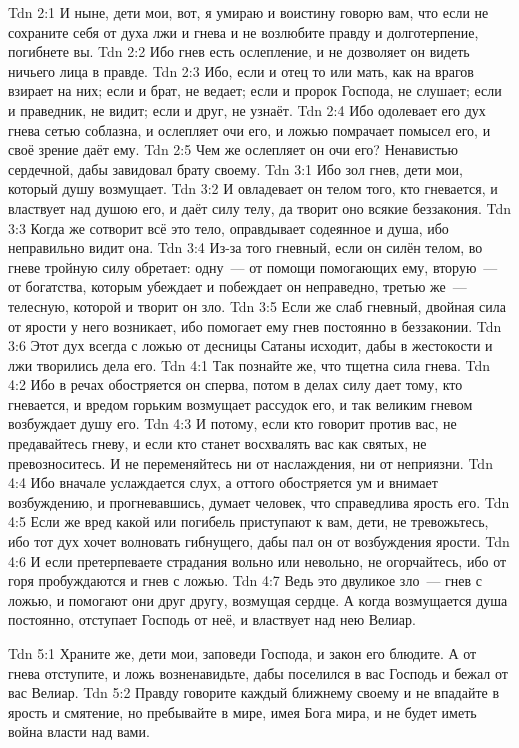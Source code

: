 \vs Tdn 2:1
И ныне, дети мои, вот, я умираю и воистину говорю вам,
что если не сохраните себя от духа лжи и гнева
и не возлюбите правду и долготерпение, погибнете вы.
\vs Tdn 2:2
Ибо гнев есть ослепление, и не дозволяет он видеть ничьего лица в правде.
\vs Tdn 2:3
Ибо, если и отец то или мать, как на врагов взирает на них;
если и брат, не ведает; если и пророк Господа, не слушает;
если и праведник, не видит; если и друг, не узнаёт.
\vs Tdn 2:4
Ибо одолевает его дух гнева сетью соблазна,
и ослепляет очи его, и ложью помрачает помысел его,
и своё зрение даёт ему.
\vs Tdn 2:5
Чем же ослепляет он очи его?
Ненавистью сердечной, дабы завидовал брату своему.
\vs Tdn 3:1
Ибо зол гнев, дети мои, который душу возмущает.
\vs Tdn 3:2
И овладевает он телом того, кто гневается,
и властвует над душою его, и даёт силу телу,
да творит оно всякие беззакония.
\vs Tdn 3:3
Когда же сотворит всё это тело, оправдывает содеянное и душа,
ибо неправильно видит она.
\vs Tdn 3:4
Из-за того гневный, если он силён телом,
во гневе тройную силу обретает:
одну~--- от помощи помогающих ему,
вторую~--- от богатства, которым убеждает и побеждает он неправедно,
третью же~--- телесную, которой и творит он зло.
\vs Tdn 3:5
Если же слаб гневный, двойная сила от ярости у него возникает,
ибо помогает ему гнев постоянно в беззаконии.
\vs Tdn 3:6
Этот дух всегда с ложью от десницы Сатаны исходит,
дабы в жестокости и лжи творились дела его.
\vs Tdn 4:1
Так познайте же, что тщетна сила гнева.
\vs Tdn 4:2
Ибо в речах обостряется он сперва, потом в делах силу дает тому,
кто гневается, и вредом горьким возмущает рассудок его,
и так великим гневом возбуждает душу его.
\vs Tdn 4:3
И потому, если кто говорит против вас, не предавайтесь гневу,
и если кто станет восхвалять вас как святых, не превозноситесь.
И не переменяйтесь ни от наслаждения, ни от неприязни.
\vs Tdn 4:4
Ибо вначале услаждается слух, а оттого обостряется ум
и внимает возбуждению, и прогневавшись, думает человек,
что справедлива ярость его.
\vs Tdn 4:5
Если же вред какой или погибель приступают к вам, дети, не тревожьтесь,
ибо тот дух хочет волновать гибнущего, дабы пал он от возбуждения ярости.
\vs Tdn 4:6
И если претерпеваете страдания вольно или невольно, не огорчайтесь, ибо
от горя пробуждаются и гнев с ложью.
\vs Tdn 4:7
Ведь это двуликое зло~--- гнев с ложью,
и помогают они друг другу, возмущая сердце.
А когда возмущается душа постоянно,
отступает Господь от неё, и властвует над нею Велиар.

\vs Tdn 5:1
Храните же, дети мои, заповеди Господа, и закон его блюдите.
А от гнева отступите, и ложь возненавидьте, дабы поселился в вас Господь
и бежал от вас Велиар.
\vs Tdn 5:2
Правду говорите каждый ближнему своему и не впадайте в ярость и смятение,
но пребывайте в мире, имея Бога мира,
и не будет иметь война власти над вами.

